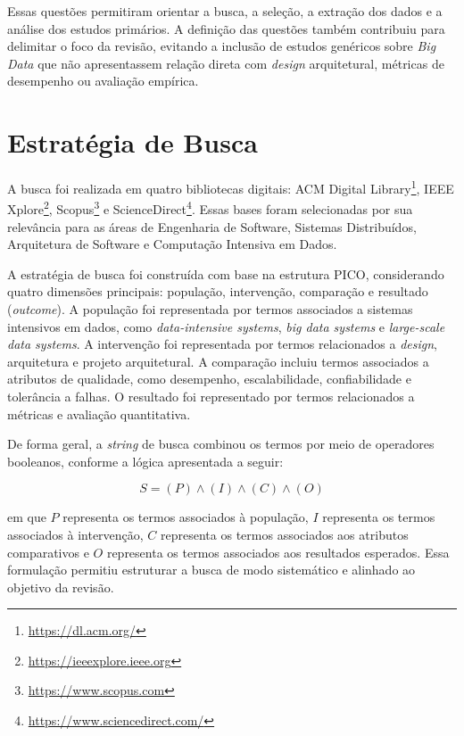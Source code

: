 Essas questões permitiram orientar a busca, a seleção, a extração dos dados e a análise dos estudos primários. A definição das questões também contribuiu para delimitar o foco da revisão, evitando a inclusão de estudos genéricos sobre \textit{Big Data} que não apresentassem relação direta com \textit{design} arquitetural, métricas de desempenho ou avaliação empírica.

\section{Estratégia de Busca}
\label{sec:rsl-estrategia-busca}

A busca foi realizada em quatro bibliotecas digitais: ACM Digital Library\footnote{\url{https://dl.acm.org/}}, IEEE Xplore\footnote{\url{https://ieeexplore.ieee.org}}, Scopus\footnote{\url{https://www.scopus.com}} e ScienceDirect\footnote{\url{https://www.sciencedirect.com/}}. Essas bases foram selecionadas por sua relevância para as áreas de Engenharia de Software, Sistemas Distribuídos, Arquitetura de Software e Computação Intensiva em Dados.

A estratégia de busca foi construída com base na estrutura PICO, considerando quatro dimensões principais: população, intervenção, comparação e resultado (\textit{outcome}). A população foi representada por termos associados a sistemas intensivos em dados, como \textit{data-intensive systems}, \textit{big data systems} e \textit{large-scale data systems}. A intervenção foi representada por termos relacionados a \textit{design}, arquitetura e projeto arquitetural. A comparação incluiu termos associados a atributos de qualidade, como desempenho, escalabilidade, confiabilidade e tolerância a falhas. O resultado foi representado por termos relacionados a métricas e avaliação quantitativa.

De forma geral, a \textit{string} de busca combinou os termos por meio de operadores booleanos, conforme a lógica apresentada a seguir:

\begin{equation}
S = (P) \land (I) \land (C) \land (O)
\label{eq:string-pico}
\end{equation}

em que $P$ representa os termos associados à população, $I$ representa os termos associados à intervenção, $C$ representa os termos associados aos atributos comparativos e $O$ representa os termos associados aos resultados esperados. Essa formulação permitiu estruturar a busca de modo sistemático e alinhado ao objetivo da revisão.

